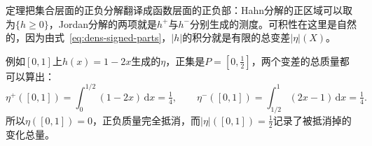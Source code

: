 定理把集合层面的正负分解翻译成函数层面的正负部：Hahn分解的正区域可以取为$\{h\geq0\}$，Jordan分解的两项就是$h^+$与$h^-$分别生成的测度。可积性在这里是自然的，因为由式~\eqref{eq:dens-signed-parts}，$\lvert h\rvert$的积分就是有限的总变差$\lvert\eta\rvert(X)$。

例如$[0,1]$上$h(x)=1-2x$生成的$\eta$，正集是$P=[0,\tfrac12]$，两个变差的总质量都可以算出：
\[
\eta^+([0,1])=\int_0^{1/2}(1-2x)\,\mathrm dx=\tfrac14,\qquad\eta^-([0,1])=\int_{1/2}^1(2x-1)\,\mathrm dx=\tfrac14 .
\]
所以$\eta([0,1])=0$，正负质量完全抵消，而$\lvert\eta\rvert([0,1])=\tfrac12$记录了被抵消掉的变化总量。
